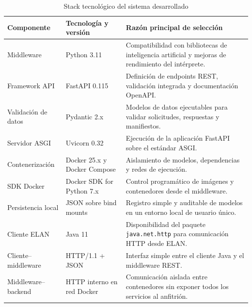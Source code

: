 \documentclass[11pt,a4paper]{article}
\begin{document}
\begin{table}[H]
\centering
\caption{Stack tecnológico del sistema desarrollado}
\label{tab:stack_tecnologico}
\footnotesize
\renewcommand{\arraystretch}{1.18}
\setlength{\tabcolsep}{5pt}

\begin{tabular}{
    >{\raggedright\arraybackslash}p{3.1cm}
    >{\raggedright\arraybackslash}p{3.4cm}
    >{\raggedright\arraybackslash}p{6.2cm}
}
\toprule
\textbf{Componente} & \textbf{Tecnología y versión} & \textbf{Razón principal de selección} \\
\midrule

Middleware &
Python 3.11 &
Compatibilidad con bibliotecas de inteligencia artificial y mejoras de rendimiento del intérprete. \\

Framework API &
FastAPI 0.115 &
Definición de endpoints REST, validación integrada y documentación OpenAPI. \\

Validación de datos &
Pydantic 2.x &
Modelos de datos ejecutables para validar solicitudes, respuestas y manifiestos. \\

Servidor ASGI &
Uvicorn 0.32 &
Ejecución de la aplicación FastAPI sobre el estándar ASGI. \\

Contenerización &
Docker 25.x y Docker Compose &
Aislamiento de modelos, dependencias y redes de ejecución. \\

SDK Docker &
Docker SDK for Python 7.x &
Control programático de imágenes y contenedores desde el middleware. \\

Persistencia local &
JSON sobre bind mounts &
Registro simple y auditable de modelos en un entorno local de usuario único. \\

Cliente ELAN &
Java 11 &
Disponibilidad del paquete \texttt{java.net.http} para comunicación HTTP desde ELAN. \\

Cliente--middleware &
HTTP/1.1 + JSON &
Interfaz simple entre el cliente Java y el middleware REST. \\

Middleware--backend &
HTTP interno en red Docker &
Comunicación aislada entre contenedores sin exponer todos los servicios al anfitrión. \\

\bottomrule
\end{tabular}
\end{table}
\end{document}
